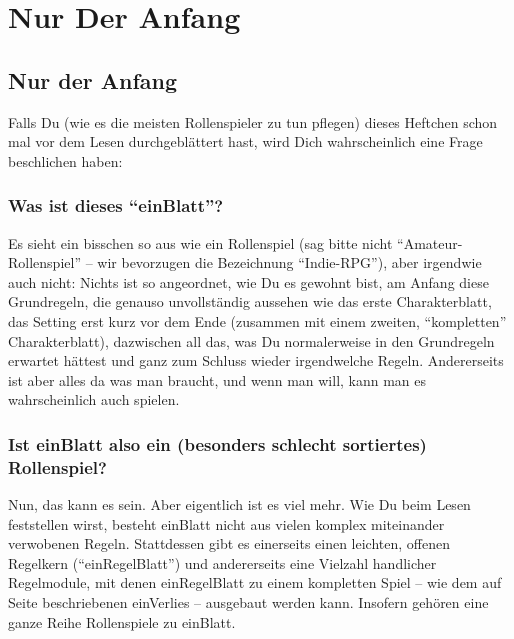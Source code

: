 \part {Nur Der Anfang}
\chapter {Nur der Anfang}

Falls Du (wie es die meisten Rollenspieler zu tun pflegen) dieses Heftchen schon mal vor dem Lesen durchgeblättert hast, wird Dich wahrscheinlich eine Frage beschlichen haben:

\section {Was ist dieses "`einBlatt"'?}
Es sieht ein bisschen so aus wie ein Rollenspiel (sag bitte nicht "`Amateur-Rollenspiel"' -- wir bevorzugen die Bezeichnung "`Indie-RPG"'), aber irgendwie auch nicht: Nichts ist so angeordnet, wie Du es gewohnt bist, am Anfang diese Grundregeln, die genauso unvollständig aussehen wie das erste Charakterblatt, das Setting erst kurz vor dem Ende (zusammen mit einem zweiten, "`kompletten"' Charakterblatt), dazwischen all das, was Du normalerweise in den Grundregeln erwartet hättest und ganz zum Schluss wieder irgendwelche Regeln. Andererseits ist aber alles da was man braucht, und wenn man will, kann man es wahrscheinlich auch spielen.

\section {Ist einBlatt also ein (besonders schlecht sortiertes) Rollenspiel?}
Nun, das kann es sein. Aber eigentlich ist es viel mehr. Wie Du beim Lesen feststellen wirst, besteht einBlatt nicht aus vielen komplex miteinander verwobenen Regeln. Stattdessen gibt es einerseits einen leichten, offenen Regelkern ("`einRegelBlatt"') und andererseits eine Vielzahl handlicher Regelmodule, mit denen einRegelBlatt zu einem kompletten Spiel -- wie dem  auf Seite \pageref {einVerlies} beschriebenen einVerlies -- ausgebaut werden kann. Insofern gehören eine ganze Reihe Rollenspiele zu einBlatt. 

